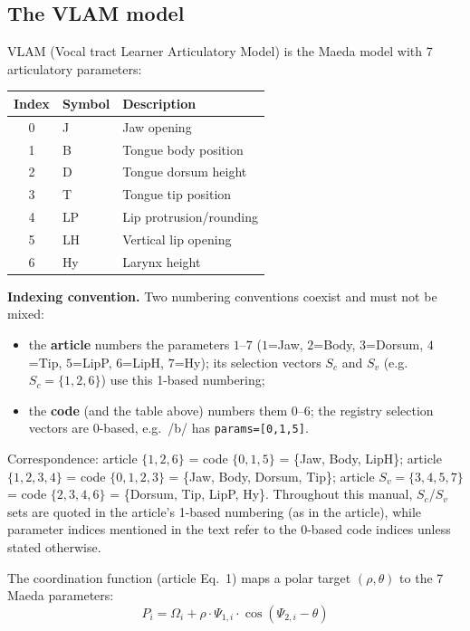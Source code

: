 \documentclass[11pt,a4paper]{article}
\begin{document}
\subsection{The VLAM model}

VLAM (Vocal tract Learner Articulatory Model) is the Maeda model
with 7 articulatory parameters:
\begin{center}
\begin{tabular}{cll}
\toprule
\textbf{Index} & \textbf{Symbol} & \textbf{Description} \\
\midrule
0 & J  & Jaw opening \\
1 & B  & Tongue body position \\
2 & D  & Tongue dorsum height \\
3 & T  & Tongue tip position \\
4 & LP & Lip protrusion/rounding \\
5 & LH & Vertical lip opening \\
6 & Hy & Larynx height \\
\bottomrule
\end{tabular}
\end{center}

\textbf{Indexing convention.} Two numbering conventions coexist and
must not be mixed:
\begin{itemize}
\item the \textbf{article} numbers the parameters $1$--$7$
  ($1$=Jaw, $2$=Body, $3$=Dorsum, $4$=Tip, $5$=LipP, $6$=LipH,
  $7$=Hy); its selection vectors $S_c$ and $S_v$ (e.g.\
  $S_c = \{1,2,6\}$) use this 1-based numbering;
\item the \textbf{code} (and the table above) numbers them $0$--$6$;
  the registry selection vectors are 0-based, e.g.\ /b/ has
  \texttt{params=[0,1,5]}.
\end{itemize}
Correspondence: article $\{1,2,6\}$ = code $\{0,1,5\}$ = \{Jaw, Body,
LipH\}; article $\{1,2,3,4\}$ = code $\{0,1,2,3\}$ = \{Jaw, Body,
Dorsum, Tip\}; article $S_v = \{3,4,5,7\}$ = code $\{2,3,4,6\}$ =
\{Dorsum, Tip, LipP, Hy\}. Throughout this manual, $S_c$/$S_v$ sets
are quoted in the article's 1-based numbering (as in the article),
while parameter indices mentioned in the text refer to the 0-based
code indices unless stated otherwise.

The coordination function (article Eq.~1) maps a polar target
$(\rho, \theta)$ to the 7 Maeda parameters:
\begin{equation}
P_i = \Omega_i + \rho \cdot \Psi_{1,i} \cdot \cos(\Psi_{2,i} - \theta)
\label{eq:coordination}
\end{equation}
\end{document}
